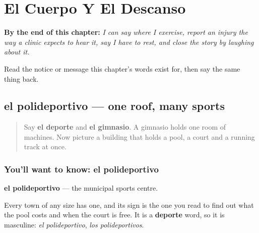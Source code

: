 
\chapter{El Cuerpo Y El Descanso}
\label{ch:es-cuerpo}

\begin{chapteropening}
\textbf{By the end of this chapter:} \emph{I can say where I exercise, report an injury the way a clinic expects to hear it, say I have to rest, and close the story by laughing about it.}

Read the notice or message this chapter's words exist for, then say the same thing back.
\end{chapteropening}

\section[el polideportivo]{el polideportivo — one roof, many sports}

\label{lesson:ES-C438-polideportivo}



\begin{quote}
Say \textbf{el deporte} and \textbf{el gimnasio}. A gimnasio holds one room of machines. Now picture a building that holds a pool, a court and a running track at once.
\end{quote}

\subsection*{You'll want to know: el polideportivo}
\textbf{el polideportivo} — the municipal sports centre.

Every town of any size has one, and its sign is the one you read to find out what the pool costs and when the court is free. It is a \textbf{deporte} word, so it is masculine: \emph{el polideportivo}, \emph{los polideportivos}.


